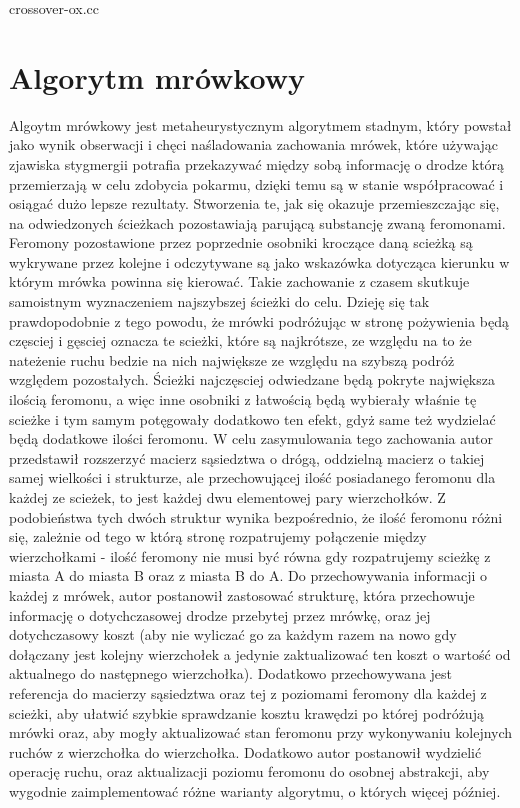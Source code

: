 \documentclass[polish,polish,a4paper]{article}
\begin{document}

{crossover-ox.cc}

\section{Algorytm mrówkowy}
\par Algoytm mrówkowy jest metaheurystycznym algorytmem stadnym, który powstał jako wynik obserwacji i chęci naśladowania zachowania mrówek, które
używając zjawiska stygmergii potrafia przekazywać między sobą informację o drodze którą przemierzają w celu zdobycia pokarmu, dzięki temu są w stanie
współpracować i osiągać dużo lepsze rezultaty. Stworzenia te, jak się okazuje przemieszczając się, na odwiedzonych ścieżkach pozostawiają parującą
substancję zwaną feromonami. Feromony pozostawione przez poprzednie osobniki kroczące daną scieżką są wykrywane przez kolejne i odczytywane są
jako wskazówka dotycząca kierunku w którym mrówka powinna się kierować. Takie zachowanie z czasem skutkuje samoistnym wyznaczeniem najszybszej ścieżki
do celu. Dzieję się tak prawdopodobnie z tego powodu, że mrówki podróżując w stronę pożywienia będą częsciej i gęsciej oznacza te scieżki, które są
najkrótsze, ze względu na to że nateżenie ruchu bedzie na nich największe ze względu na szybszą podróż względem pozostałych. Ścieżki najczęsciej odwiedzane
będą pokryte największa ilością feromonu, a więc inne osobniki z łatwością będą wybierały właśnie tę scieżke i tym samym potęgowały dodatkowo ten efekt,
gdyż same też wydzielać będą dodatkowe ilości feromonu. W celu zasymulowania tego zachowania autor przedstawił rozszerzyć macierz sąsiedztwa o drógą,
oddzielną macierz o takiej samej wielkości i strukturze, ale przechowującej ilość posiadanego feromonu dla każdej ze scieżek, to jest każdej dwu
elementowej pary wierzchołków. Z podobieństwa tych dwóch struktur wynika bezpośrednio, że ilość feromonu różni się, zależnie od tego w którą stronę
rozpatrujemy połączenie między wierzchołkami - ilość feromony nie musi być równa gdy rozpatrujemy scieżkę z miasta A do miasta B oraz z miasta B do A.
Do przechowywania informacji o każdej z mrówek, autor postanowił zastosować strukturę, która przechowuje informację o dotychczasowej drodze przebytej
przez mrówkę, oraz jej dotychczasowy koszt (aby nie wyliczać go za każdym razem na nowo gdy dołączany jest kolejny wierzchołek a jedynie zaktualizować
ten koszt o wartość od aktualnego do następnego wierzchołka). Dodatkowo przechowywana jest referencja do macierzy sąsiedztwa oraz tej z poziomami
feromony dla każdej z scieżki, aby ułatwić szybkie sprawdzanie kosztu krawędzi po której podróżują mrówki oraz, aby mogły aktualizować stan feromonu
przy wykonywaniu kolejnych ruchów z wierzchołka do wierzchołka. Dodatkowo autor postanowił wydzielić operację ruchu, oraz aktualizacji poziomu feromonu
do osobnej abstrakcji, aby wygodnie zaimplementować różne warianty algorytmu, o których więcej później.
\end{document}
